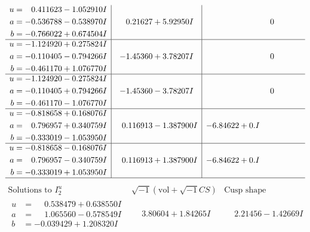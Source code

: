 \documentclass[1p]{elsarticle_modified}
\theoremstyle{definition}
\newcommand{\I}{\sqrt{-1}}
\begin{document}
$$\begin{array}{c|c|c}
\begin{aligned}
u &= \phantom{-}0.411623 - 1.052910 I \\
a &= -0.536788 - 0.538970 I \\
b &= -0.766022 + 0.674504 I\end{aligned}
 & \phantom{-}0.21627 + 5.92950 I & \phantom{-0.000000 } 0 \\ \hline\begin{aligned}
u &= -1.124920 + 0.275824 I \\
a &= -0.110405 - 0.794266 I \\
b &= -0.461170 + 1.076770 I\end{aligned}
 & -1.45360 + 3.78207 I & \phantom{-0.000000 } 0 \\ \hline\begin{aligned}
u &= -1.124920 - 0.275824 I \\
a &= -0.110405 + 0.794266 I \\
b &= -0.461170 - 1.076770 I\end{aligned}
 & -1.45360 - 3.78207 I & \phantom{-0.000000 } 0 \\ \hline\begin{aligned}
u &= -0.818658 + 0.168076 I \\
a &= \phantom{-}0.796957 + 0.340759 I \\
b &= -0.333019 - 1.053950 I\end{aligned}
 & \phantom{-}0.116913 - 1.387900 I & -6.84622 + 0. I\phantom{ +0.000000I} \\ \hline\begin{aligned}
u &= -0.818658 - 0.168076 I \\
a &= \phantom{-}0.796957 - 0.340759 I \\
b &= -0.333019 + 1.053950 I\end{aligned}
 & \phantom{-}0.116913 + 1.387900 I & -6.84622 + 0. I\phantom{ +0.000000I}\\
 \hline 
 \end{array}$$\newpage$$\begin{array}{c|c|c}  
\text{Solutions to }I^u_{2}& \I (\text{vol} + \sqrt{-1}CS) & \text{Cusp shape}\\
 \hline 
\begin{aligned}
u &= \phantom{-}0.538479 + 0.638550 I \\
a &= \phantom{-}1.065560 - 0.578549 I \\
b &= -0.039429 + 1.208320 I\end{aligned}
 & \phantom{-}3.80604 + 1.84265 I & \phantom{-}2.21456 - 1.42669 I \\ \hline\begin{aligned}

\end{aligned}
\end{array}$$
\end{document}
